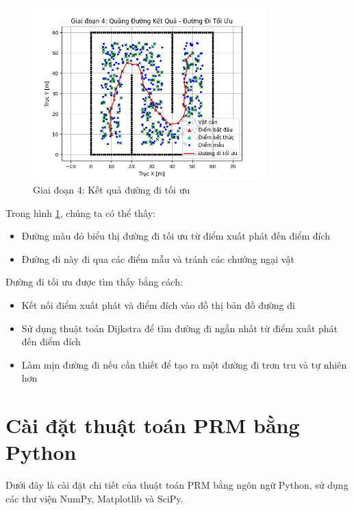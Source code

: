 \documentclass[12pt,a4paper,openany,oneside]{report}
\begin{document}
\begin{figure}[H]
    \centering
    \includegraphics[width=0.8\textwidth]{giai_doan_4}
    \caption{Giai đoạn 4: Kết quả đường đi tối ưu}
    \label{fig:stage4}
\end{figure}

Trong hình \ref{fig:stage4}, chúng ta có thể thấy:
\begin{itemize}
    \item Đường màu đỏ biểu thị đường đi tối ưu từ điểm xuất phát đến điểm đích
    \item Đường đi này đi qua các điểm mẫu và tránh các chướng ngại vật
\end{itemize}

Đường đi tối ưu được tìm thấy bằng cách:
\begin{itemize}
    \item Kết nối điểm xuất phát và điểm đích vào đồ thị bản đồ đường đi
    \item Sử dụng thuật toán Dijkstra để tìm đường đi ngắn nhất từ điểm xuất phát đến điểm đích
    \item Làm mịn đường đi nếu cần thiết để tạo ra một đường đi trơn tru và tự nhiên hơn
\end{itemize}

\section{Cài đặt thuật toán PRM bằng Python}

Dưới đây là cài đặt chi tiết của thuật toán PRM bằng ngôn ngữ Python, sử dụng các thư viện NumPy, Matplotlib và SciPy.
\end{document}
